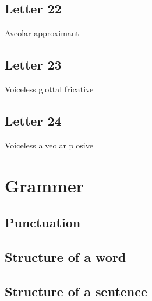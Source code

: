 \documentclass{article}
\newcommand{\letter}[1]{\begin{center}\resizebox{1cm}{!}{\texttt{[image: \#1]}}\end{center}}
\begin{document}
\subsection{Letter 22}
Aveolar approximant

\letter{letters/consonants/22.JPG}

\subsection{Letter 23}
Voiceless glottal fricative

\letter{letters/consonants/23.JPG}

\subsection{Letter 24}
Voiceless alveolar plosive

\letter{letters/consonants/24.JPG}



\section{Grammer}
\subsection{Punctuation}


\subsection{Structure of a word}


\subsection{Structure of a sentence}
\end{document}
